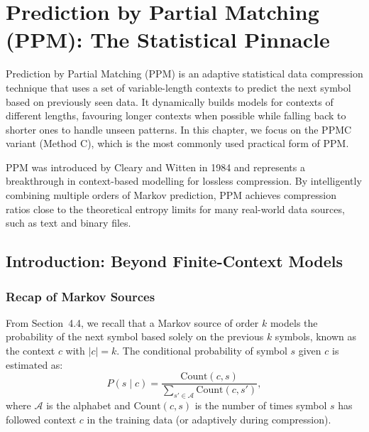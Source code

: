 \section{Prediction by Partial Matching (PPM): The Statistical Pinnacle}

\begin{definitionbox}
Prediction by Partial Matching (PPM) is an adaptive statistical data compression
technique that uses a set of variable-length contexts to predict the next symbol
based on previously seen data. It dynamically builds models for contexts of
different lengths, favouring longer contexts when possible while falling back to
shorter ones to handle unseen patterns. In this chapter, we focus on the PPMC
variant (Method C), which is the most commonly used practical form of PPM.
\end{definitionbox}

PPM was introduced by Cleary and Witten in 1984 and represents a breakthrough in
context-based modelling for lossless compression. By intelligently combining
multiple orders of Markov prediction, PPM achieves compression ratios close to the
theoretical entropy limits for many real-world data sources, such as text and binary
files.

\subsection{Introduction: Beyond Finite-Context Models}

\subsubsection{Recap of Markov Sources}

From Section~4.4, we recall that a Markov source of order $k$ models the probability
of the next symbol based solely on the previous $k$ symbols, known as the context $c$
with $|c| = k$. The conditional probability of symbol $s$ given $c$ is estimated as:
\[
    P(s \mid c)
    = \frac{\text{Count}(c, s)}{\displaystyle\sum_{s' \in \mathcal{A}} \text{Count}(c, s')},
\]
where $\mathcal{A}$ is the alphabet and $\text{Count}(c, s)$ is the number of times
symbol $s$ has followed context $c$ in the training data (or adaptively during
compression).

